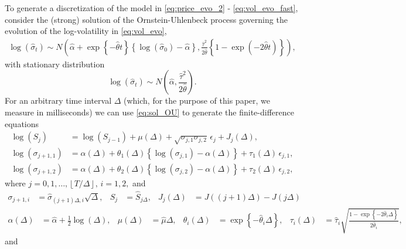 \documentclass[10pt]{article}
\newcommand{\halpha}{\hat{\alpha}}
\begin{document}
To generate a discretization of the model in \eqref{eq:price_evo_2} - \eqref{eq:vol_evo_fast}, consider the (strong) solution of the Ornstein-Uhlenbeck process governing the evolution of the log-volatility in \eqref{eq:vol_evo},
\begin{align}\label{eq:sol_OU}
  \log(\hat{\sigma}_t) \sim N\left( \hat{\alpha} + \exp\left\{
      -\hat{\theta} t \right\} \left\{ \log(\hat{\sigma}_0) -
      \hat{\alpha} \right\}, \frac{\hat{\tau}^2}{2\hat{\theta}}\left\{
      1- \exp(-2\hat{\theta}t) \right\} \right)    ,
\end{align}
with stationary distribution
\begin{equation} \label{eq:stat-dist}
  \log(\hat{\sigma}_t) \sim N \left( \hat{\alpha} ,
    \frac{\hat{\tau}^2}{2\hat{\theta}} \right).
\end{equation}
For an arbitrary time interval $\Delta$ (which, for the purpose of this paper, we measure in milliseconds) we can use \eqref{eq:sol_OU} to generate the finite-difference equations
\begin{align}
  \log(S_{j}) &= \log(S_{j-1}) + \mu(\Delta) + \sqrt{\sigma_{j,1}\sigma_{j,2}} \, \epsilon_{j} + J_j(\Delta)   ,  \label{eq:price_evo_disc}  \\
  \log(\sigma_{j+1,1}) &= \alpha(\Delta) + \theta_1(\Delta) \left\{ \log(\sigma_{j,1}) - \alpha(\Delta) \right\} + \tau_1(\Delta) \, \epsilon_{j,1}    ,  \label{eq:vol_evo_slow_disc}  \\
  \log(\sigma_{j+1,2}) &= \alpha(\Delta) + \theta_2(\Delta) \left\{ \log(\sigma_{j,2}) - \alpha(\Delta) \right\} + \tau_2(\Delta) \, \epsilon_{j,2}    , \label{eq:vol_evo_fast_disc}
\end{align}
where $j = 0, 1, \ldots, \left\lfloor T/\Delta \right\rfloor, \, i = 1,2,$ and
\begin{align}
  \sigma_{j+1,i} &= \hat{\sigma}_{(j+1)\Delta,i}\sqrt{\Delta}, & S_j &= \hat{S}_{j\Delta}, & J_j(\Delta) &= J((j+1)\Delta) - J(j\Delta)
\end{align}
\begin{align} \alpha(\Delta) &= \halpha + \frac{1}{2}\log(\Delta) , &
  \mu(\Delta) &= \hat{\mu} \Delta , & \theta_i(\Delta) &= \exp\left\{
    -\hat{\theta}_i \Delta \right\} , & \tau_i(\Delta) &= \hat{\tau}_i
  \sqrt{ \frac{1 - \exp \left\{ -2\hat{\theta}_i \Delta
      \right\}}{2\hat{\theta}_i } }, \label{eq:mu_sigma_tau}
\end{align}
and
\end{document}

